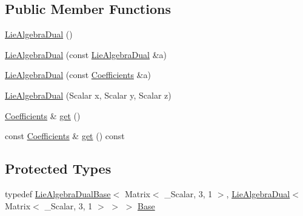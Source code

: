 \subsection*{Public Member Functions}
\begin{DoxyCompactItemize}
\item 
\hyperlink{class_lie_algebra_dual_3_01_matrix_3_01___scalar_00_013_00_011_01_4_01_4_a9fa79ebe0f2e3fecd359e63eeb91671a}{Lie\+Algebra\+Dual} ()
\item 
\hyperlink{class_lie_algebra_dual_3_01_matrix_3_01___scalar_00_013_00_011_01_4_01_4_a0f7a068bd94405c6cfc04d3664c5042b}{Lie\+Algebra\+Dual} (const \hyperlink{class_lie_algebra_dual}{Lie\+Algebra\+Dual} \&a)
\item 
\hyperlink{class_lie_algebra_dual_3_01_matrix_3_01___scalar_00_013_00_011_01_4_01_4_ae77a75bc1bef31fa4498c3e4b3888707}{Lie\+Algebra\+Dual} (const \hyperlink{class_lie_algebra_dual_3_01_matrix_3_01___scalar_00_013_00_011_01_4_01_4_ae90a3999d66fafefffe5538cd72985ee}{Coefficients} \&a)
\item 
\hyperlink{class_lie_algebra_dual_3_01_matrix_3_01___scalar_00_013_00_011_01_4_01_4_a6d74b87931ff21cb2a83d32d11a91f27}{Lie\+Algebra\+Dual} (Scalar x, Scalar y, Scalar z)
\item 
\hyperlink{class_lie_algebra_dual_3_01_matrix_3_01___scalar_00_013_00_011_01_4_01_4_ae90a3999d66fafefffe5538cd72985ee}{Coefficients} \& \hyperlink{class_lie_algebra_dual_3_01_matrix_3_01___scalar_00_013_00_011_01_4_01_4_a9bad4e5052a104271c6566e1f9ac3f68}{get} ()
\item 
const \hyperlink{class_lie_algebra_dual_3_01_matrix_3_01___scalar_00_013_00_011_01_4_01_4_ae90a3999d66fafefffe5538cd72985ee}{Coefficients} \& \hyperlink{class_lie_algebra_dual_3_01_matrix_3_01___scalar_00_013_00_011_01_4_01_4_af6625b0911823ad35ae1f5fa23c3d7db}{get} () const
\end{DoxyCompactItemize}
\subsection*{Protected Types}
\begin{DoxyCompactItemize}
\item 
typedef \hyperlink{class_lie_algebra_dual_base}{Lie\+Algebra\+Dual\+Base}$<$ Matrix$<$ \+\_\+\+Scalar, 3, 1 $>$, \hyperlink{class_lie_algebra_dual}{Lie\+Algebra\+Dual}$<$ Matrix$<$ \+\_\+\+Scalar, 3, 1 $>$ $>$ $>$ \hyperlink{class_lie_algebra_dual_3_01_matrix_3_01___scalar_00_013_00_011_01_4_01_4_a32622861071e6634cc868d5e6ec115c7}{Base}
\end{DoxyCompactItemize}
